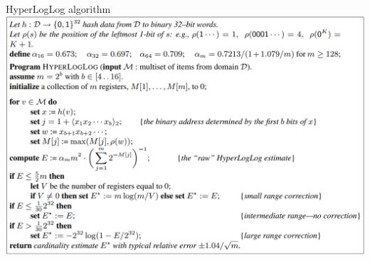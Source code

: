 \documentclass[10pt]{beamer}
\begin{document}
  
\begin{frame}{HyperLogLog algorithm}
  \includegraphics[scale=.42]{hyperloglog.png}
\end{frame}
\end{document}
